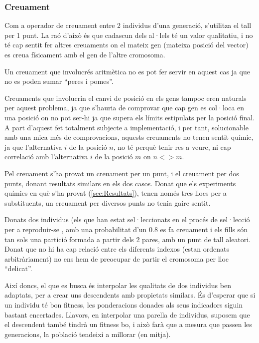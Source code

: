 \subsubsection{Creuament} %
\label{ssub:Crossover}

Com a operador de creuament entre 2 individus d'una generació, s'utilitza el
tall per 1 punt.  La raó d'això és que cadascun dels al·lels té un valor
qualitatiu, i no té cap sentit fer altres creuaments on el mateix gen (mateixa
posició del vector) es creua físicament amb el gen de l'altre cromosoma.

Un creuament que involucrés aritmètica no es pot fer servir en aquest cas ja que
no es poden sumar ``peres i pomes''.

Creuaments que involucrin el canvi de posició en els gens tampoc eren naturals
per aquest problema, ja que s'hauria de comprovar que cap gen es col·loca en una
posició on no pot ser-hi ja que supera els límits estipulats per la
posició final.  A part d'aquest fet totalment subjecte a implementació, i per
tant, solucionable amb una mica més de comprovacions, aquests creuaments no
tenen sentit químic, ja que l'alternativa $i$ de la posició $n$, no té perquè
tenir res a veure, ni cap correlació amb l'alternativa $i$ de la posició $m$ on
$n <> m$.

Pel creuament s'ha provat un creuament per un punt, i el creuament per dos
punts, donant resultats similars en els dos casos.  Donat que els experiments
químics en què s'ha provat (\ref{sec:Resultats}), tenen només tres llocs per a
substituents, un creuament per diversos punts no tenia gaire sentit.

Donats dos individus (els que han estat sel·leccionats en el procés de
sel·lecció per a reproduir-se , amb una probabilitat d'un 0.8 es fa creuament i
els fills són tan sols una partició formada a partir dels 2 pares, amb un punt
de tall aleatori.  Donat que no hi ha cap relació entre els diferents indexos
(estan ordenats arbitràriament) no ens hem de preocupar de partir el cromosoma
per lloc ``delicat''. 

Així doncs, el que es busca és interpolar les qualitats de dos individus ben
adaptats, per a crear uns descendents amb propietats similars.  És d'esperar que
si un individu té bon fitness, les ponderacions donades als seus indicadors
siguin bastant encertades.  Llavors, en interpolar una parella de individus,
suposem que el descendent també tindrà un fitness bo, i això farà que a mesura
que passen les generacions, la població tendeixi a millorar (en mitja).


